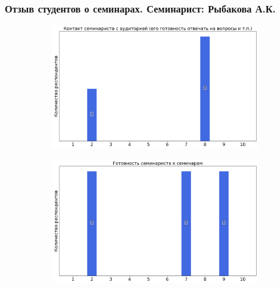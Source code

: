 		
	\subsubsection{Отзыв студентов о семинарах. Семинарист: Рыбакова А.К.}
		\begin{figure}[H]
			\centering
			\begin{subfigure}[b]{0.45\textwidth}
				\centering
				\includegraphics[width=\textwidth]{images/2 course/Общая физика - электричество и магнетизм/seminarists-marks-Рыбакова А.К.-0.png}
			\end{subfigure}
			\begin{subfigure}[b]{0.45\textwidth}
				\centering
				\includegraphics[width=\textwidth]{images/2 course/Общая физика - электричество и магнетизм/seminarists-marks-Рыбакова А.К.-1.png}
			\end{subfigure}
			\begin{subfigure}[b]{0.45\textwidth}
				\centering

\end{subfigure}
\end{figure}
